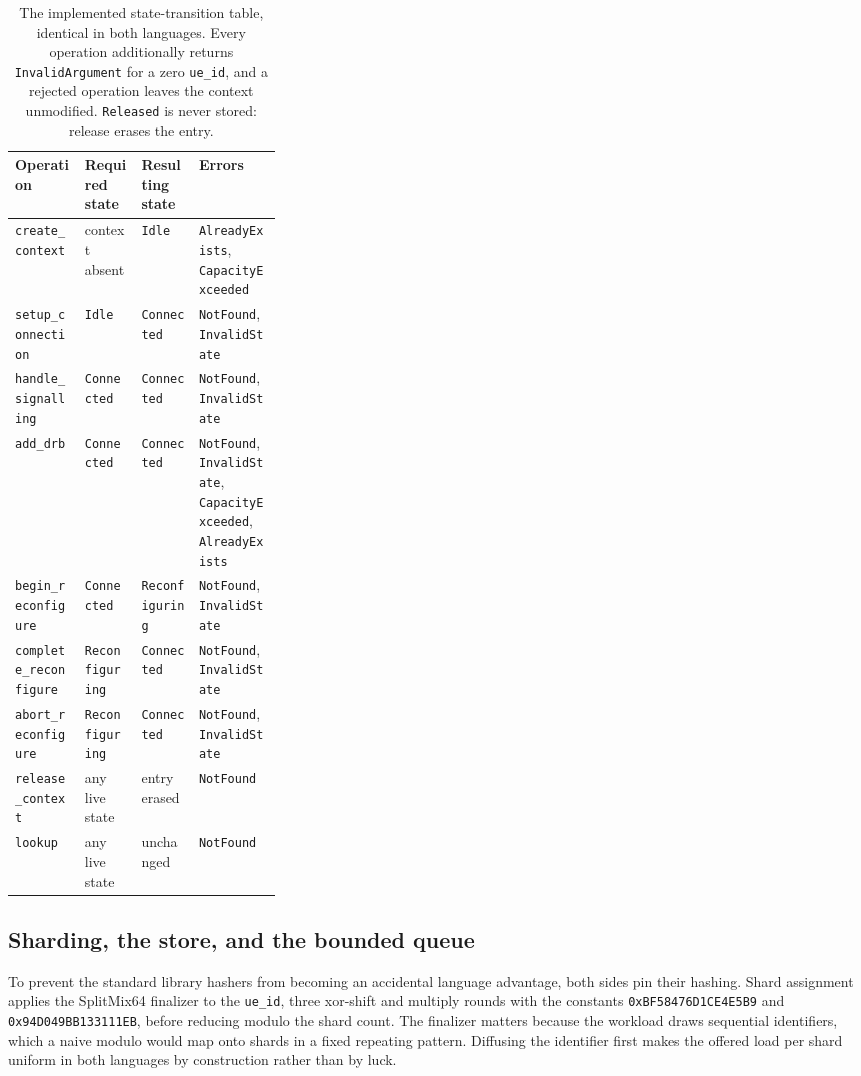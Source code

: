 \documentclass[english,twoside,openright,a4paper,censored,csm,software-track-2020]{HYthesisML}
\begin{document}
\begin{table}[H]
\centering
\small
\caption[The implemented state-transition table]{The implemented state-transition table, identical in both languages. Every operation
additionally returns \texttt{InvalidArgument} for a zero \texttt{ue\_id}, and a rejected
operation leaves the context unmodified. \texttt{Released} is never stored: release erases
the entry.\label{tab:transitions}}
\begin{tabular}{@{}l l l R{0.31\linewidth}@{}}
\hline\hline
Operation & Required state & Resulting state & Errors \\
\hline
\texttt{create\_context}       & context absent   & \texttt{Idle}          & \texttt{AlreadyExists}, \texttt{CapacityExceeded} \\
\texttt{setup\_connection}     & \texttt{Idle}          & \texttt{Connected}     & \texttt{NotFound}, \texttt{InvalidState} \\
\texttt{handle\_signalling}     & \texttt{Connected}     & \texttt{Connected}     & \texttt{NotFound}, \texttt{InvalidState} \\
\texttt{add\_drb}              & \texttt{Connected}     & \texttt{Connected}     & \texttt{NotFound}, \texttt{InvalidState}, \texttt{CapacityExceeded}, \texttt{AlreadyExists} \\
\texttt{begin\_reconfigure}    & \texttt{Connected}     & \texttt{Reconfiguring} & \texttt{NotFound}, \texttt{InvalidState} \\
\texttt{complete\_reconfigure} & \texttt{Reconfiguring} & \texttt{Connected}     & \texttt{NotFound}, \texttt{InvalidState} \\
\texttt{abort\_reconfigure}    & \texttt{Reconfiguring} & \texttt{Connected}     & \texttt{NotFound}, \texttt{InvalidState} \\
\texttt{release\_context}      & any live state   & entry erased           & \texttt{NotFound} \\
\texttt{lookup}                & any live state   & unchanged              & \texttt{NotFound} \\
\hline
\end{tabular}
\end{table}

\subsection{Sharding, the store, and the bounded queue}
To prevent the standard library hashers from becoming an accidental language advantage, both
sides pin their hashing. Shard assignment applies the SplitMix64 finalizer to the
\texttt{ue\_id}, three xor-shift and multiply rounds with the constants
\texttt{0xBF58476D1CE4E5B9} and \texttt{0x94D049BB133111EB}, before reducing modulo the shard
count. The finalizer matters because the workload draws sequential identifiers, which a naive
modulo would map onto shards in a fixed repeating pattern. Diffusing the identifier first makes
the offered load per shard uniform in both languages by construction rather than by luck.
\end{document}
